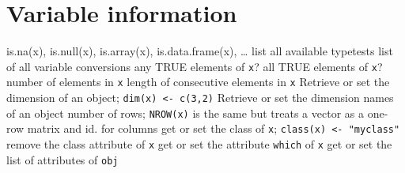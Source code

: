 \section{Variable information}{is.na(x), is.null(x), is.array(x), is.data.frame(x), \ldots}
	{list all available typetests}
	{list of all variable conversions}
	{any TRUE elements of {\tt x}?}
	{all TRUE elements of {\tt x}?}
	{ number of elements in {\tt x}}
	{length of consecutive elements in {\tt x}}
	{Retrieve or set the dimension of an object; {\tt dim(x) <- c(3,2)}}
	{Retrieve or set the dimension names of an object}
	{number of rows; {\tt NROW(x)} is the same but treats a vector as a one-row matrix}
	{and}
	{id. for columns}
	{get or set the class of {\tt x}; {\tt class(x) <- "myclass"}}
	{remove the class attribute of {\tt x}}
	{get or set the attribute {\tt which} of {\tt x}}
	{get or set the list of attributes of {\tt obj}}

